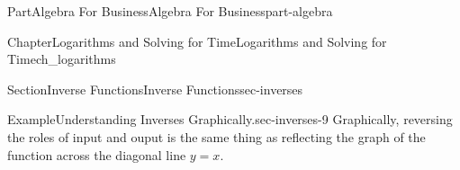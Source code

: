 \documentclass[oneside,10pt,]{tufte-book}
\numberwithin{equation}{chapter}
\begin{document}
\begin{partptx}{Part}{Algebra For Business}{}{Algebra For Business}{}{}{part-algebra}
\begin{chapterptx}{Chapter}{Logarithms and Solving for Time}{}{Logarithms and Solving for Time}{}{}{ch_logarithms}
\begin{sectionptx}{Section}{Inverse Functions}{}{Inverse Functions}{}{}{sec-inverses}
\begin{example}{Example}{Understanding Inverses Graphically.}{sec-inverses-9}
Graphically, reversing the roles of input and ouput is the same thing as reflecting the graph of the function across the diagonal line \(y=x\).%
\begin{image}{0}{1}{0}{}%
\end{image}
\end{example}
\end{sectionptx}
\end{chapterptx}
\end{partptx}
\end{document}
